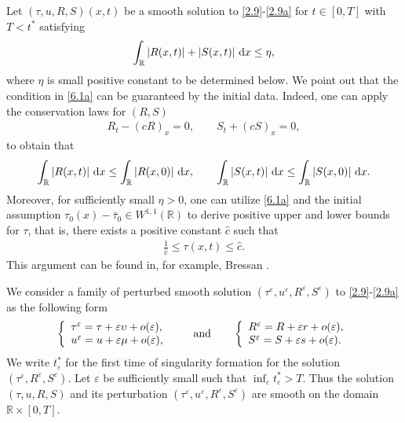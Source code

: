 \documentclass[11pt,reqno]{article}
\newcommand{\eps}{\varepsilon}
\newcommand{\fr}{\frac}
\numberwithin{equation}{section}
\begin{document}
Let $(\tau, u, R, S)(x,t)$ be a smooth solution to \eqref{2.9}-\eqref{2.9a} for $t\in[0,T]$ with $T<t^*$ satisfying
\begin{align}\label{6.1a}
\int_{\mathbb{R}}|R(x, t)|+|S(x, t)|\ {\rm d}x\leq  \eta,
\end{align}
where $\eta$ is small positive constant to be determined below. We point out that the condition in \eqref{6.1a} can be guaranteed by the initial data. Indeed, one can apply the conservation laws for $(R, S)$
\begin{align}\label{6.1c}
R_t-(cR)_x=0,\qquad S_t+(cS)_x=0,
\end{align}
to obtain that
\begin{align}\label{6.1d}
\int_{\mathbb{R}}|R(x,t)|\ {\rm d}x\leq \int_{\mathbb{R}}|R(x,0)|\ {\rm d}x,\qquad \int_{\mathbb{R}}|S(x,t)|\ {\rm d}x\leq \int_{\mathbb{R}}|S(x,0)|\ {\rm d}x.
\end{align}
Moreover, for sufficiently small $\eta>0$, one can utilize \eqref{6.1a} and the initial assumption $\tau_0(x)-\bar{\tau}_0\in W^{1,1}(\mathbb{R})$ to derive positive upper and lower bounds for $\tau$, that is, there exists a positive constant $\hat{c}$ such that
\begin{align}\label{6.1b}
\fr{1}{\hat{c}}\leq \tau(x,t) \leq \hat{c}.
\end{align}
This argument can be found in, for example, Bressan \cite{Bre}.

We consider a family of perturbed smooth solution $(\tau^\eps, u^\eps, R^\eps, S^\eps)$ to \eqref{2.9}-\eqref{2.9a} as the following form
\begin{align}\label{6.1}
\left\{
\begin{array}{l}
\tau^\eps=\tau+\eps \upsilon+o(\eps),\\
u^\eps=u+\eps \mu+o(\eps),
\end{array}
\right.
\qquad {\rm and}\qquad
\left\{
\begin{array}{l}
R^\eps=R+\eps r +o(\eps),\\
S^\eps=S+\eps s +o(\eps).
\end{array}
\right.
\end{align}
We write $t_{\eps}^*$ for the first time of singularity formation for the solution $(\tau^\eps, R^\eps, S^\eps)$. Let $\eps$ be sufficiently small such that $\inf_{\eps} t_{\eps}^*>T$.
Thus the solution $(\tau, u, R, S)$ and its perturbation $(\tau^\eps, u^\eps, R^\eps, S^\eps)$ are smooth on the domain $\mathbb{R}\times[0,T]$.
\end{document}
